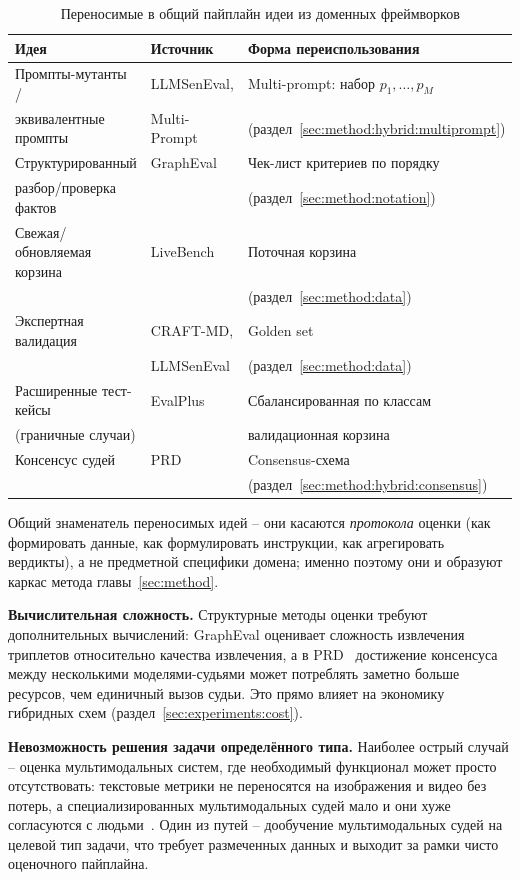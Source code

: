 \begin{table}[htbp]
    \centering
    \caption{Переносимые в общий пайплайн идеи из доменных фреймворков}
    \label{tab:transferable}
    \begin{tabular}{lll}
        \toprule
        Идея & Источник & Форма переиспользования \\
        \midrule
        Промпты-мутанты / & LLMSenEval, & Multi-prompt: набор $p_1,\dots,p_M$ \\
        \;эквивалентные промпты & Multi-Prompt & (раздел~\ref{sec:method:hybrid:multiprompt}) \\
        Структурированный & GraphEval & Чек-лист критериев по порядку \\
        \;разбор/проверка фактов & & (раздел~\ref{sec:method:notation}) \\
        Свежая/обновляемая корзина & LiveBench & Поточная корзина \\
        & & (раздел~\ref{sec:method:data}) \\
        Экспертная валидация & CRAFT-MD, & Golden set \\
        & LLMSenEval & (раздел~\ref{sec:method:data}) \\
        Расширенные тест-кейсы & EvalPlus & Сбалансированная по классам \\
        \;(граничные случаи) & & валидационная корзина \\
        Консенсус судей & PRD & Consensus-схема \\
        & & (раздел~\ref{sec:method:hybrid:consensus}) \\
        \bottomrule
    \end{tabular}
\end{table}

Общий знаменатель переносимых идей -- они касаются \emph{протокола}
оценки (как формировать данные, как формулировать инструкции, как
агрегировать вердикты), а не предметной специфики домена; именно
поэтому они и образуют каркас метода главы~\ref{sec:method}.

\textbf{Вычислительная сложность.}
Структурные методы оценки требуют дополнительных вычислений: GraphEval
оценивает сложность извлечения триплетов относительно качества
извлечения, а в PRD~\cite{li2023prd} достижение консенсуса между
несколькими моделями-судьями может потреблять заметно больше ресурсов,
чем единичный вызов судьи.
Это прямо влияет на экономику гибридных схем
(раздел~\ref{sec:experiments:cost}).

\textbf{Невозможность решения задачи определённого типа.}
Наиболее острый случай -- оценка мультимодальных систем, где
необходимый функционал может просто отсутствовать: текстовые метрики
не переносятся на изображения и видео без потерь, а специализированных
мультимодальных судей мало и они хуже согласуются с
людьми~\cite{chen2024mllmjudge}.
Один из путей -- дообучение мультимодальных судей на целевой тип
задачи, что требует размеченных данных и выходит за рамки чисто
оценочного пайплайна.

